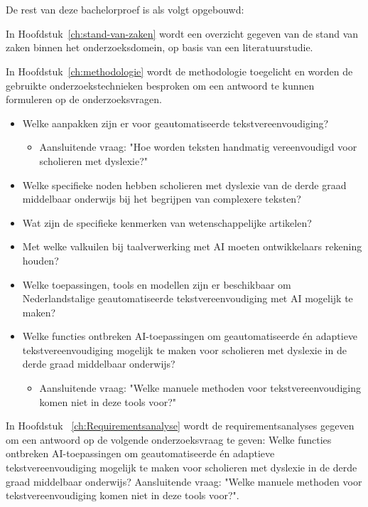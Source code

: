 \section{}%
\label{sec:opzet-bachelorproef}

De rest van deze bachelorproef is als volgt opgebouwd:

In Hoofdstuk~\ref{ch:stand-van-zaken} wordt een overzicht gegeven van de stand van zaken binnen het onderzoeksdomein, op basis van een literatuurstudie.

In Hoofdstuk~\ref{ch:methodologie} wordt de methodologie toegelicht en worden de gebruikte onderzoekstechnieken besproken om een antwoord te kunnen formuleren op de onderzoeksvragen.

\begin{itemize}
	\item Welke aanpakken zijn er voor geautomatiseerde tekstvereenvoudiging?
	\begin{itemize}
		\item Aansluitende vraag: "Hoe worden teksten handmatig vereenvoudigd voor scholieren met dyslexie?"
	\end{itemize}
	\item Welke specifieke noden hebben scholieren met dyslexie van de derde graad middelbaar onderwijs bij het begrijpen van complexere teksten?
	\item Wat zijn de specifieke kenmerken van wetenschappelijke artikelen? 
	\item Met welke valkuilen bij taalverwerking met AI moeten ontwikkelaars rekening houden?
	\item Welke toepassingen, tools en modellen zijn er beschikbaar om Nederlandstalige geautomatiseerde tekstvereenvoudiging met AI mogelijk te maken?
	\item Welke functies ontbreken AI-toepassingen om geautomatiseerde én adaptieve tekstvereenvoudiging mogelijk te maken voor \newline scholieren met dyslexie in de derde graad middelbaar onderwijs? 
	\begin{itemize}
		\item Aansluitende vraag: "Welke manuele methoden voor tekstvereenvoudiging komen niet in deze tools voor?"
	\end{itemize}
\end{itemize}

In Hoofdstuk ~\ref{ch:Requirementsanalyse} wordt de requirementsanalyses gegeven om een antwoord op de volgende onderzoeksvraag te geven: Welke functies ontbreken AI-toepassingen om geautomatiseerde én adaptieve tekstvereenvoudiging mogelijk te maken voor \newline scholieren met dyslexie in de derde graad middelbaar onderwijs? Aansluitende vraag: "Welke manuele methoden voor tekstvereenvoudiging komen niet in deze tools voor?".

